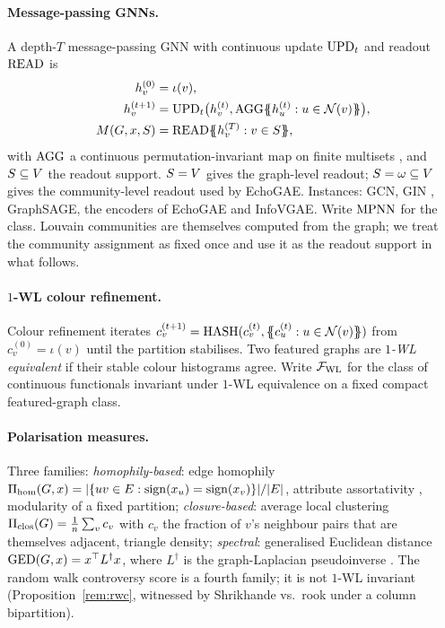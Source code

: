 \documentclass[letterpaper]{article} %
\begin{document}
\paragraph{Message-passing GNNs.} A depth-$T$ message-passing GNN
with continuous update $\mathrm{UPD}_t$ and readout $\mathrm{READ}$ is
\begin{align*}
h^{(0)}_v &= \iota(v), \\
h^{(t+1)}_v &= \upd_t\bigl(h^{(t)}_v, \agg\{\!\!\{h^{(t)}_u : u \in \neigh{v}\}\!\!\}\bigr), \\
M(\gph, x, S) &= \readout\{\!\!\{h^{(T)}_v : v \in S\}\!\!\},
\end{align*}
with $\mathrm{AGG}$ a continuous permutation-invariant map on finite
multisets \citep{GilmerNeuralMessagePassing2017}, and $S \subseteq
V$ the readout support. $S = V$ gives the
graph-level readout; $S = \omega \subseteq V$ gives the
community-level readout used by EchoGAE. Instances: GCN, GIN
\citep{XuGIN2019}, GraphSAGE, the encoders of EchoGAE and
InfoVGAE. Write $\mathrm{MPNN}$ for the class. Louvain communities are
themselves computed from the graph; we treat the community
assignment as fixed once and use it as the readout support in
what follows.

\paragraph{$1$-WL colour refinement.} Colour refinement iterates
$c^{(t+1)}_v = \mathrm{HASH}(c^{(t)}_v, \{\!\!\{c^{(t)}_u : u \in
\mathcal{N}(v)\}\!\!\})$ from $c^{(0)}_v = \iota(v)$ until the partition
stabilises. Two featured graphs are \emph{$1$-WL equivalent} if
their stable colour histograms agree. Write $\mathcal{F}_{\mathrm{WL}}$ for
the class of continuous functionals invariant under $1$-WL
equivalence on a fixed compact featured-graph class.

\paragraph{Polarisation measures.} Three families:
\emph{homophily-based}: edge homophily $\Pi_{\mathrm{hom}}(G, x) =
|\{uv \in E : \mathrm{sign}(x_u) = \mathrm{sign}(x_v)\}| /
|E|$, attribute assortativity \citep{Newman2003}, modularity
of a fixed partition; \emph{closure-based}: average local
clustering $\Pi_{\mathrm{clos}}(G) = \tfrac{1}{n} \sum_v c_v$ with $c_v$
the fraction of $v$'s neighbour pairs that are themselves adjacent,
triangle density; \emph{spectral}: generalised Euclidean distance
$\mathrm{GED}(G, x) = x^\top L^\dagger x$, where $L^\dagger$ is the
graph-Laplacian pseudoinverse \citep{HohmannGED2023}. The random
walk controversy score \citep{Garimella18} is a fourth family;
it is not $1$-WL invariant (Proposition~\ref{rem:rwc},
witnessed by Shrikhande vs.~rook under a column bipartition).
\end{document}
